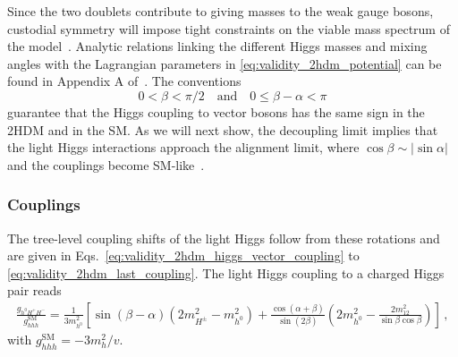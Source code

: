 Since the two doublets contribute to giving masses to the weak gauge
bosons, custodial symmetry will impose tight constraints on the viable
mass spectrum of the model~\cite{Veltman:1976rt, Toussaint:1978zm,
  Frere:1982ma, Grimus:2007if, Hollik:1986gg, Beenakker:1988pv,
  Froggatt:1991qw, He:2001tp, Grimus:2008nb}.  Analytic relations
linking the different Higgs masses and mixing angles with the
Lagrangian parameters in \autoref{eq:validity_2hdm_potential} can be found
\eg in Appendix A of~\cite{Lopez-Val:2013yba}.  The conventions
%
\begin{equation}
  0 <\beta < \pi/2
  \quad \text{and} \quad
  0 \leq \beta-\alpha < \pi
\end{equation}
%
guarantee that the Higgs coupling to vector bosons has the same sign
in the 2HDM and in the SM.  As we will next show, the decoupling limit
implies that the light Higgs interactions approach the alignment
limit, where $\cos\beta \sim |\sin\alpha|$ and the couplings become
SM-like~\cite{Gunion:2002zf}.



\subsubsection{Couplings}

The tree-level coupling shifts of the light Higgs follow from these
rotations and are given in
Eqs.~\eqref{eq:validity_2hdm_higgs_vector_coupling} to
\eqref{eq:validity_2hdm_last_coupling}. The light Higgs
coupling to a charged Higgs pair reads
%
\begin{align}
   \frac {g_{h^0{H^+}{H^{-}}}}{g^\text{SM}_{hhh}}
  = \frac{1}{3 m_{h^0}^2}
  \left[ 
  \sin (\beta - \alpha) \left( 2 m_{H^\pm}^2 - m_{h^0}^2 \right)
  + \frac {\cos (\alpha + \beta)} {\sin (2\beta)}
  \left(2m_{h^0}^2 - \frac {2 m_{12}^2}{\sin \beta \cos \beta} \right)
  \right] \, ,
\end{align}
%
with $g^\text{SM}_{hhh} = -3 m_h^2/v$.

